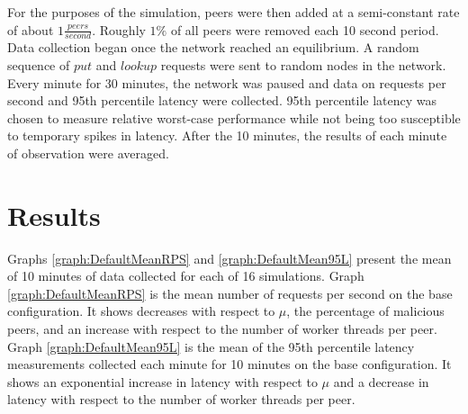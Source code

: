 \documentclass[12pt]{report}
\theoremstyle{plain}
\begin{document}
	
	For the purposes of the simulation, peers were then added at a semi-constant rate of about $1 \frac{peers}{second}$.
	Roughly $1\%$ of all peers were removed each 10 second period. Data collection began once the network reached an equilibrium. 
	A random sequence of $put$ and $lookup$ requests were sent to random nodes in the network. 
	Every minute for 30 minutes, the network was paused and data on requests per second and 95th percentile latency were collected.
	95th percentile latency was chosen to measure relative worst-case performance while not being too susceptible to temporary spikes in latency.
	After the 10 minutes, the results of each minute of observation were averaged.
	

\section*{Results}

	\hspace{-0.75cm}
	\begin{minipage}{0.95\textwidth}
	\vspace{-0.15cm}
	\centering
	\begin{multicols}{2}
		\begin{graph}[H]%
			\centering%
		\end{graph}%
		\begin{graph}[H]%
			\centering%
		\end{graph}%
	\end{multicols}
	\vspace{0.3cm}
	\end{minipage}


	Graphs \ref{graph:DefaultMeanRPS} and \ref{graph:DefaultMean95L} present the mean of 10 minutes of data collected for each of 16 simulations. 
	Graph \ref{graph:DefaultMeanRPS} is the mean number of requests per second on the base configuration.
	It shows decreases with respect to $\mu$, the percentage of malicious peers, and an increase with respect to the number of worker threads per peer.
	Graph \ref{graph:DefaultMean95L} is the mean of the 95th percentile latency measurements collected each minute for 10 minutes on the base configuration. 
	It shows an exponential increase in latency with respect to $\mu$ and a decrease in latency with respect to the number of worker threads per peer.

	\hspace{-0.75cm}
	\begin{minipage}{0.95\textwidth}
	\vspace{-0.15cm}
	\begin{multicols}{2}
		\begin{graph}[H]%
			\centering%
		\end{graph}%
		\begin{graph}[H]%
			\centering%
		\end{graph}%
	\end{multicols}
	\vspace{0.3cm}
	\end{minipage}
	
\end{document}
